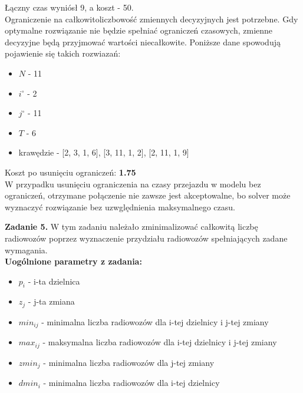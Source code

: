 \documentclass[15pt, a4paper]{article}
\begin{document}
Łączny czas wyniósł 9, a koszt - 50.\\

Ograniczenie na całkowitoliczbowość zmiennych decyzyjnych jest potrzebne. Gdy optymalne rozwiązanie nie będzie spełniać ograniczeń czasowych, zmienne decyzyjne będą przyjmować wartości niecałkowite. Poniższe dane spowodują pojawienie się takich rozwiazań:

\begin{itemize}
    \item \(N\) - 11
    \item \(i^{\circ}\) - 2
    \item \(j^{\circ}\) - 11
    \item \(T \) - 6
    \item krawędzie -  [2, 3, 1, 6],
    [3, 11, 1, 2],
    [2, 11, 1, 9]
\end{itemize}

Koszt po usunięciu ograniczeń: \textbf{1.75}\\

W przypadku usunięciu ograniczenia na czasy przejazdu w modelu bez ograniczeń, otrzymane połączenie nie zawsze jest akceptowalne, bo solver może wyznaczyć rozwiązanie bez uzwględnienia maksymalnego czasu.


\vspace{0.5cm}

\noindent\hrulefill

\vspace{0.5cm}


\noindent\textbf{Zadanie 5.} W tym zadaniu należało zminimalizować całkowitą liczbę radiowozów poprzez wyznaczenie przydziału radiowozów spełniających zadane wymagania.\\

\noindent\textbf{Uogólnione parametry z zadania:}

\begin{itemize}
    \item \( p_i \) - i-ta dzielnica
    \item \( z_j \) - j-ta zmiana
    \item \( min_{ij} \) - minimalna liczba radiowozów dla i-tej dzielnicy i j-tej zmiany
    \item \( max_{ij} \) - maksymalna liczba radiowozów dla i-tej dzielnicy i j-tej zmiany
    \item \( zmin_{j} \) - minimalna liczba radiowozów dla j-tej zmiany 
    \item \( dmin_{i} \) - minimalna liczba radiowozów dla i-tej dzielnicy
\end{itemize}
\end{document}
